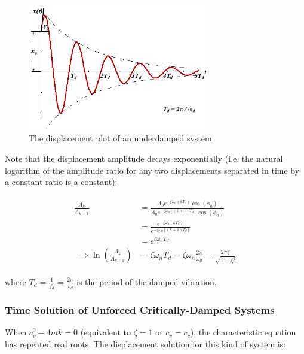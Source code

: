 \documentclass[10pt,b5paper,titlepage]{book}
\newenvironment{eqarray}
{
    \begin{eqnarray}
        \begin{aligned}
}
{
        \end{aligned}
    \end{eqnarray}
}
\begin{document}
\begin{figure}[ht]
    \centering
    \includegraphics[width=0.70\textwidth]{img/SDOF_UnderDamped_Response.png}
    \caption{The displacement plot of an underdamped system}
    \label{fig:SDOF-underdamped-response-png}
\end{figure}

Note that the displacement amplitude decays exponentially (i.e. the natural
logarithm of the amplitude ratio for any two displacements separated in time
by a constant ratio is a constant):

\begin{eqarray}
    \frac{A_k}{A_{k+1}} &=
    \frac{A_0 e^{-\zeta \omega_n \left( k T_d \right)} \cos{ \left( \phi_0 \right) }}
         {A_0 e^{-\zeta \omega_n \left[ (k+1) T_d \right]} \cos{ \left( \phi_0 \right) }}\\
                        &=
    \frac{e^{-\zeta \omega_n \left( k T_d \right)}}
         {e^{-\zeta \omega_n \left[ (k+1) T_d \right]}}\\
                        &= e^{\zeta \omega_n T_d}\\
    \implies \ln{\left( \frac{A_k}{A_{k+1}} \right)} &=
    \zeta \omega_n T_d = \zeta \omega_n \frac{2 \pi}{\omega_d}
    = \frac{2 \pi \zeta}{\sqrt{1 - \zeta^2}}
\end{eqarray}

where $ T_d = \frac{1}{f_d} = \frac{2 \pi}{\omega_d} $ is the period of the
damped vibration.


\subsubsection{Time Solution of Unforced Critically-Damped Systems}

When $ c_v^2 - 4 m k = 0 $ (equivalent to $ \zeta = 1 $ or $ c_v = c_c $), the
characteristic equation has repeated real roots. The displacement solution for
this kind of system is:
\end{document}
